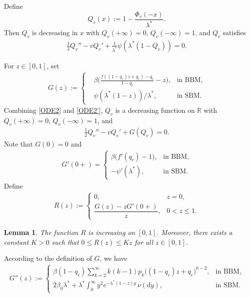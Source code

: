 \documentclass[10pt,a4paper]{amsart}
\newtheorem{lemma}[thrm]{Lemma}
\numberwithin{equation}{section}
\def\proof{\noindent{\it Proof.~}}
\begin{document}
Define
\[
Q_v(x) := 1 - \frac{\Phi_v(-x)}{\lambda^*}
.
\]
Then
 $Q_v$ is decreasing in $x$ with $Q_v(+\infty) = 0$, $Q_v(-\infty) = 1$, and $Q_v$ satisfies
\begin{align}\label{ODE2'}
	\frac{1}{2} Q_v'' - v Q_v' + 
	\frac{1}{\lambda^*}\psi(\lambda^*(1-Q_v))= 0.
\end{align}


For $z\in [0,1]$, set 
\begin{align*}
	G(z) :=  
	\left\{
	\begin{aligned}
		&\beta\big( \frac{f((1-q_c)z+q_c)-q_c}{1-q_c} -z\big), &  \mbox{in BBM},\\
		&\psi(\lambda^*(1-z))/\lambda^*, & \mbox{in SBM}.
	\end{aligned}
	\right.
\end{align*}
Combining \eqref{ODE2} and \eqref{ODE2'}, $Q_v$ is a decreasing function on $\mathbb{R}$ with $Q_v(+\infty) = 0$, $Q_v(-\infty) = 1$, and
\begin{align}\label{ODE3}
	\frac{1}{2} Q_v'' - v Q_v' + G(Q_v) = 0.
\end{align}
Note that $G(0) = 0$ and 
\begin{align}\label{Def-of-G-prime}
	G'(0+) = 
	\begin{cases}
		\beta\bigl(f'(q_c) - 1\bigr), & \text{in BBM},\\[4pt]
		-\psi'(\lambda^*), & \text{in SBM}.
	\end{cases}
\end{align}
Define
\begin{align}\label{Def-of-R}
	R(z) := 
	\begin{cases}
		0, & z = 0,\\[4pt]
		\dfrac{G(z) - z G'(0+)}{z}, & 0 < z \le 1.
	\end{cases}
\end{align}
\begin{lemma}\label{lem1}
The function $R$ is increasing on $[0,1]$. Moreover, there exists a constant $K > 0$ such that $0 \leq R(z) \leq K z$ for all $z \in [0,1]$.
\end{lemma}
\proof 
According to the definition of $G$, we have
\begin{align*}
	G''(z) := 
	\begin{cases}
		\beta(1 - q_c) \displaystyle \sum_{k=2}^\infty k(k-1)p_k\bigl((1 - q_c)z + q_c\bigr)^{k-2}, & \text{in BBM},\\[8pt]
		2\beta_0\lambda^*+\lambda^* \displaystyle \int_0^\infty y^2 e^{-\lambda^*(1 - z)y} \, \nu(\mathrm{d}y), & \text{in SBM}.
	\end{cases}
\end{align*}
\end{document}
